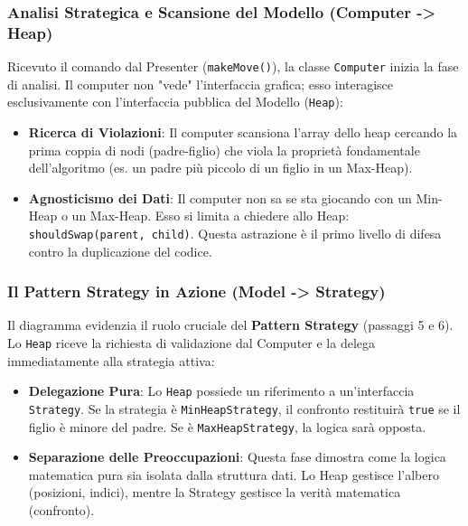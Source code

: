 \documentclass[openany]{theme/uniprthesis}
\begin{document}
\subsubsection{Analisi Strategica e Scansione del Modello (Computer -> Heap)}
Ricevuto il comando dal Presenter (\texttt{makeMove()}), la classe \texttt{Computer} inizia la fase di analisi. Il computer non "vede" l'interfaccia grafica; esso interagisce esclusivamente con l'interfaccia pubblica del Modello (\texttt{Heap}):
\begin{itemize}
    \item \textbf{Ricerca di Violazioni}: Il computer scansiona l'array dello heap cercando la prima coppia di nodi (padre-figlio) che viola la proprietà fondamentale dell'algoritmo (es. un padre più piccolo di un figlio in un Max-Heap).
    \item \textbf{Agnosticismo dei Dati}: Il computer non sa se sta giocando con un Min-Heap o un Max-Heap. Esso si limita a chiedere allo Heap: \texttt{shouldSwap(parent, child)}. Questa astrazione è il primo livello di difesa contro la duplicazione del codice.
\end{itemize}

\subsubsection{Il Pattern Strategy in Azione (Model -> Strategy)}
Il diagramma evidenzia il ruolo cruciale del \textbf{Pattern Strategy} (passaggi 5 e 6). Lo \texttt{Heap} riceve la richiesta di validazione dal Computer e la delega immediatamente alla strategia attiva:
\begin{itemize}
    \item \textbf{Delegazione Pura}: Lo \texttt{Heap} possiede un riferimento a un'interfaccia \texttt{Strategy}. Se la strategia è \texttt{MinHeapStrategy}, il confronto restituirà \texttt{true} se il figlio è minore del padre. Se è \texttt{MaxHeapStrategy}, la logica sarà opposta.
    \item \textbf{Separazione delle Preoccupazioni}: Questa fase dimostra come la logica matematica pura sia isolata dalla struttura dati. Lo Heap gestisce l'albero (posizioni, indici), mentre la Strategy gestisce la verità matematica (confronto).
\end{itemize}

\end{document}
